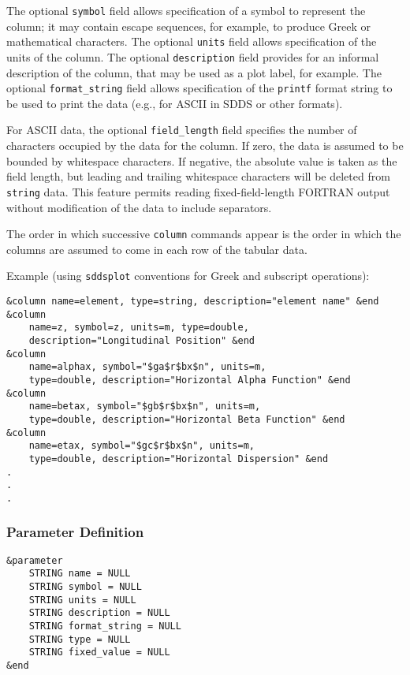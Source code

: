 \documentclass[11pt]{article}
\begin{document}
The optional {\tt symbol} field allows specification of a symbol to represent the column; it may contain escape
sequences, for example, to produce Greek or mathematical characters.  The optional {\tt units} field allows
specification of the units of the column.  The optional {\tt description} field provides for an informal description of
the column, that may be used as a plot label, for example.  The optional {\tt format\_string} field allows specification
of the {\tt printf} format string to be used to print the data (e.g., for ASCII in SDDS or other formats).

For ASCII data, the optional {\tt field\_length} field specifies the number of characters occupied by
the data for the column.  If zero, the data is assumed to be bounded by whitespace characters.  If negative,
the absolute value is taken as the field length, but leading and trailing whitespace characters will be
deleted from {\tt string} data.  This feature permits reading fixed-field-length FORTRAN output without
modification of the data to include separators.

The order in which successive {\tt column} commands appear is the order in which the columns are assumed to
come in each row of the tabular data.

Example (using {\tt sddsplot} conventions for Greek and subscript operations):
\begin{verbatim}
&column name=element, type=string, description="element name" &end
&column 
    name=z, symbol=z, units=m, type=double, 
    description="Longitudinal Position" &end
&column 
    name=alphax, symbol="$ga$r$bx$n", units=m, 
    type=double, description="Horizontal Alpha Function" &end
&column 
    name=betax, symbol="$gb$r$bx$n", units=m, 
    type=double, description="Horizontal Beta Function" &end
&column 
    name=etax, symbol="$gc$r$bx$n", units=m, 
    type=double, description="Horizontal Dispersion" &end
.
.
.
\end{verbatim}

\subsubsection{Parameter Definition}
\begin{verbatim}
&parameter
    STRING name = NULL
    STRING symbol = NULL
    STRING units = NULL
    STRING description = NULL
    STRING format_string = NULL
    STRING type = NULL
    STRING fixed_value = NULL
&end
\end{verbatim}
\end{document}
